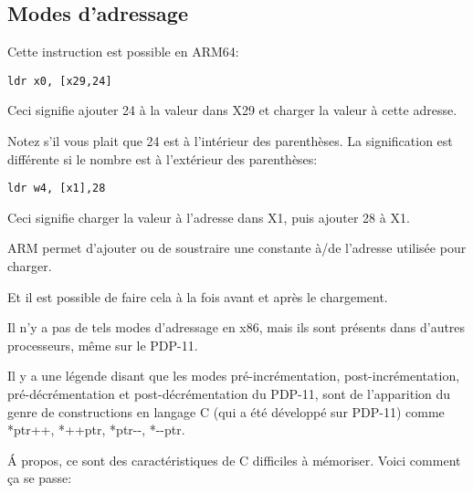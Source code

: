 ﻿\subsection{Modes d'adressage}
\label{ARM_postindex_vs_preindex}
\myindex{\CLanguageElements!\PostIncrement}
\myindex{\CLanguageElements!\PostDecrement}
\myindex{\CLanguageElements!\PreIncrement}
\myindex{\CLanguageElements!\PreDecrement}

Cette instruction est possible en ARM64:

\begin{lstlisting}[style=customasmARM]
ldr	x0, [x29,24]
\end{lstlisting}

Ceci signifie ajouter 24 à la valeur dans X29 et charger la valeur à cette adresse.

Notez s'il vous plait que 24 est à l'intérieur des parenthèses.
La signification est différente si le nombre est à l'extérieur des parenthèses:

\begin{lstlisting}[style=customasmARM]
ldr	w4, [x1],28
\end{lstlisting}

Ceci signifie charger la valeur à l'adresse dans X1, puis ajouter 28 à X1.


ARM permet d'ajouter ou de soustraire une constante à/de l'adresse utilisée pour charger.

Et il est possible de faire cela à la fois avant et après le chargement.

Il n'y a pas de tels modes d'adressage en x86, mais ils sont présents dans d'autres
processeurs, même sur le PDP-11.

Il y a une légende disant que les modes pré-incrémentation, post-incrémentation,
pré-décrémentation et post-décrémentation du PDP-11, sont  de l'apparition
du genre de constructions en langage C (qui a été développé sur PDP-11) comme
*ptr++, *++ptr, *ptr-{}-, *-{}-ptr. 

Á propos, ce sont des caractéristiques de C difficiles à mémoriser.
Voici comment ça se passe:


